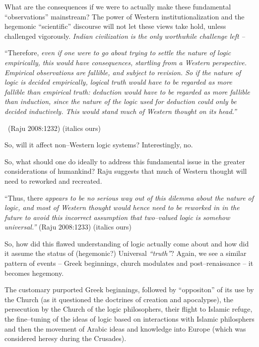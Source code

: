 What are the consequences if we were to actually make these fundamental “observations” mainstream? The power of Western institutionalization and the hegemonic “scientific” discourse will not let these views take hold, unless challenged vigorously. \textit{Indian civilization is the only worthwhile challenge left –}

\begin{myquote}
“Therefore, \textit{even if one were to go about trying to settle the nature of logic empirically, this would have consequences, startling from a Western perspective. Empirical observations are fallible, and subject to revision. So if the nature of logic is decided empirically, logical truth would have to be regarded as more fallible than empirical truth: deduction would have to be regarded as more fallible than induction, since the nature of the logic used for deduction could only be decided inductively. This would stand much of Western thought on its head.”} 

~\hfill (Raju 2008:1232) (italics ours)
\end{myquote}

So, will it affect non–Western logic systems? Interestingly, no.

So, what should one do ideally to address this fundamental issue in the greater considerations of humankind? Raju suggests that much of Western thought will need to reworked and recreated.

\begin{myquote}
“Thus, there \textit{appears to be no serious way out of this dilemma about the nature of logic, and most of Western thought would hence need to be reworked in in the future to avoid this incorrect assumption that two–valued logic is somehow universal.”} \hfill (Raju 2008:1233) (italics ours)
\end{myquote}

So, how did this flawed understanding of logic actually come about and how did it assume the status of (hegemonic?) Universal \textit{“truth”}? Again, we see a similar pattern of events – Greek beginnings, church modulates and post–renaissance – it becomes hegemony.

The customary purported Greek beginnings, followed by “oppositon” of its use by the Church (as it questioned the doctrines of creation and apocalypse), the persecution by the Church of the logic philosophers, their flight to Islamic refuge, the fine–tuning of the ideas of logic based on interactions with Islamic philosphers and then the movement of Arabic ideas and knowledge into Europe (which was considered heresy during the Crusades).

